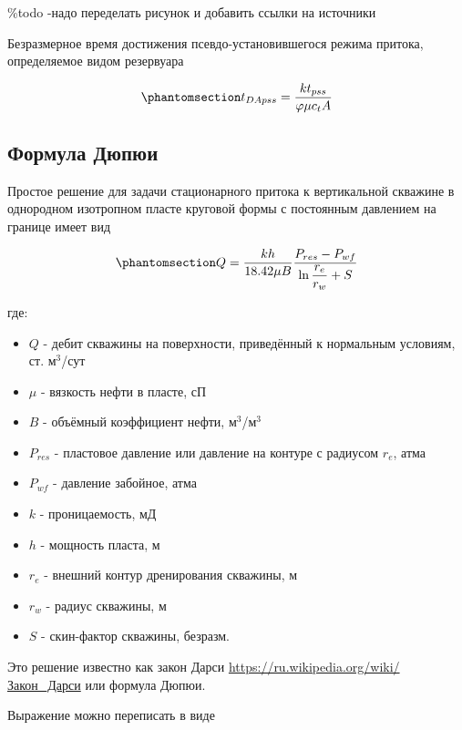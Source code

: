 \documentclass[
  russian,
  letterpaper,
  DIV=11,
  numbers=noendperiod,
  oneside]{scrartcl}
\providecommand{\tightlist}{%
  \setlength{\itemsep}{0pt}\setlength{\parskip}{0pt}}
\begin{document}
\%todo -надо переделать рисунок и добавить ссылки на источники

Безразмерное время достижения псевдо-установившегося режима притока,
определяемое видом резервуара

\begin{equation}\phantomsection\label{eq-td_pss}{ 
t_{DApss} = \frac{kt_{pss}}{\varphi \mu c_t A} 
}\end{equation}

\subsection{Формула
Дюпюи}\label{ux444ux43eux440ux43cux443ux43bux430-ux434ux44eux43fux44eux438}

Простое решение для задачи стационарного притока к вертикальной скважине
в однородном изотропном пласте круговой формы с постоянным давлением на
границе имеет вид

\begin{equation}\phantomsection\label{eq-dupui_2}{
    Q=\dfrac{kh}{18.42\mu B} \dfrac{P_{res}-P_{wf}}{\ln \dfrac{r_e}{r_w} + S} 
}\end{equation}

где:

\begin{itemize}
\tightlist
\item
  \(Q\) - дебит скважины на поверхности, приведённый к нормальным
  условиям, ст. м\(^3\)/сут
\item
  \(\mu\) - вязкость нефти в пласте, сП
\item
  \(B\) - объёмный коэффициент нефти, м\(^3\)/м\(^3\)
\item
  \(P_{res}\) - пластовое давление или давление на контуре с радиусом
  \(r_e\), атма
\item
  \(P_{wf}\) - давление забойное, атма
\item
  \(k\) - проницаемость, мД
\item
  \(h\) - мощность пласта, м
\item
  \(r_e\) - внешний контур дренирования скважины, м
\item
  \(r_w\) - радиус скважины, м
\item
  \(S\) - скин-фактор скважины, безразм.
\end{itemize}

Это решение известно как закон Дарси
\url{https://ru.wikipedia.org/wiki/Закон_Дарси} или формула Дюпюи.

Выражение можно переписать в виде
\end{document}
